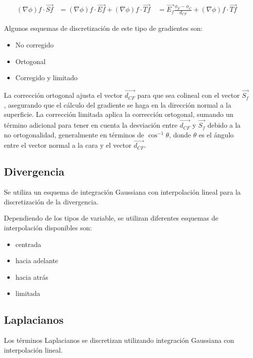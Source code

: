 \begin{align}
\label{eq
}
%
{(\nabla \phi)}{f}\cdot \vec{S{f}} &= {(\nabla \phi)}{f}\cdot \vec{E{f}} + {(\nabla \phi)}{f}\cdot \vec{T{f}} \
%
&= \vec{E_{f}}\frac{\phi_{F}-\phi_{C}}{d_{CF}}+ {(\nabla \phi)}{f}\cdot \vec{T{f}}
\end{align}

%
Algunos esquemas de discretización de este tipo de gradientes son:
\begin{itemize}
\item No corregido
\item Ortogonal
\item Corregido y limitado
\end{itemize}

La corrección ortogonal ajusta el vector $\vec{d_{CF}}$ para que sea colineal con el vector $\vec{S_{f}}$, asegurando que el cálculo del gradiente se haga en la dirección normal a la superficie.
%
La corrección limitada aplica la corrección ortogonal, sumando un término adicional para tener en cuenta la desviación entre $\vec{d_{CF}}$ y $\vec{S_{f}}$ debido a la no ortogonalidad, generalmente en términos de $\cos^{-1}{\theta}$, donde $\theta$ es el ángulo entre el vector normal a la cara y el vector $\vec{d_{CF}}$.

\subsection{Divergencia}
%
Se utiliza un esquema de integración Gaussiana con interpolación lineal para
la discretización de la divergencia.

Dependiendo de los tipos de variable, se utilizan diferentes esquemas de
interpolación disponibles son:
%
\begin{itemize}
        \item centrada
        \item hacia adelante
        \item hacia atrás
        \item limitada
\end{itemize}

\subsection{Laplacianos}
%
Los términos Laplacianos se discretizan utilizando integración Gaussiana con
interpolación lineal.
